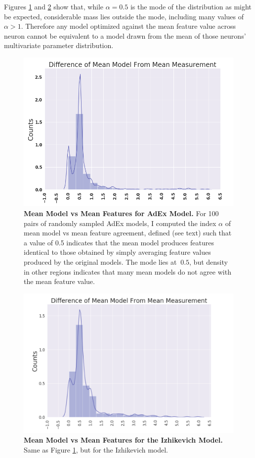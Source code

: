 Figures \ref{fig:mean-model-1} and \ref{fig:mean-model-2} show that, while $\alpha=0.5$ is the mode of the distribution as might be expected, considerable mass lies outside the mode, including many values of $\alpha>1$.
Therefore any model optimized against the mean feature value across neuron cannot be equivalent to a model drawn from the mean of those neurons' multivariate parameter distribution.

\begin{figure}
    \centering
    \includegraphics{figures/mean_model_vs_mean_measurement.png}
    \caption[Mean Model vs Mean Features for AdEx]{\textbf{Mean Model vs Mean Features for AdEx Model.} For 100 pairs of randomly sampled AdEx models, I computed the index $\alpha$ of mean model vs mean feature agreement, defined (see text) such that a value of 0.5 indicates that the mean model produces features identical to those obtained by simply averaging feature values produced by the original models.
    The mode lies at $~0.5$, but density in other regions indicates that many mean models do not agree with the mean feature value.}
    \label{fig:mean-model-1}
\end{figure}

\begin{figure}
    \centering
    \includegraphics{figures/reproduced_izhi.png}
    \caption[Mean Model vs Mean Features for Izhikevich]{\textbf{Mean Model vs Mean Features for the Izhikevich Model.} Same as Figure \ref{fig:mean-model-1}, but for the Izhikevich model.}
    \label{fig:mean-model-2}
\end{figure}

